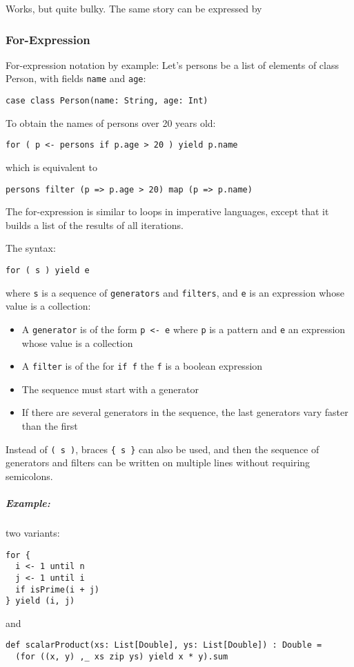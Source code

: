 \documentclass{scrartcl}
\newcommand{\example}{\subparagraph{Example:}} %
\newcommand{\term}[1]{\verb~#1~} %
\begin{document}
Works, but quite bulky. The same story can be expressed by

\subsubsection{For-Expression}
\label{sec:ForExpression}
For-expression notation by example: Let's persons be a list of elements of class
Person, with fields \lstinline|name| and \lstinline|age|:
\begin{lstlisting}
case class Person(name: String, age: Int)
\end{lstlisting}
To obtain the names of persons over 20 years old:
\begin{lstlisting}
for ( p <- persons if p.age > 20 ) yield p.name
\end{lstlisting}
which is equivalent to
\begin{lstlisting}
persons filter (p => p.age > 20) map (p => p.name)
\end{lstlisting}

The for-expression is similar to loops in imperative languages, except that it
builds a list of the results of all iterations.

The syntax:
\begin{lstlisting}
for ( s ) yield e
\end{lstlisting}

where \lstinline|s| is a sequence of \term{generators} and \term{filters}, and
\lstinline|e| is an expression whose value is a collection:
\begin{itemize}
\item A \term{generator} is of the form \lstinline|p <- e| where \lstinline|p|
  is a pattern and \lstinline|e| an expression whose value is a collection
\item A \term{filter} is of the for \lstinline|if f| the \lstinline|f| is a
  boolean expression
\item The sequence must start with a generator
\item If there are several generators in the sequence, the last generators vary
  faster than the first
\end{itemize}

Instead of \lstinline|( s )|, braces \lstinline|{ s }| can also be used, and
then the sequence of generators and filters can be written on multiple lines
without requiring semicolons.

\example two variants:
\begin{lstlisting}
for {
  i <- 1 until n
  j <- 1 until i
  if isPrime(i + j)
} yield (i, j)
\end{lstlisting}
and
\begin{lstlisting}
def scalarProduct(xs: List[Double], ys: List[Double]) : Double =
  (for ((x, y) ,_ xs zip ys) yield x * y).sum
\end{lstlisting}
\end{document}
